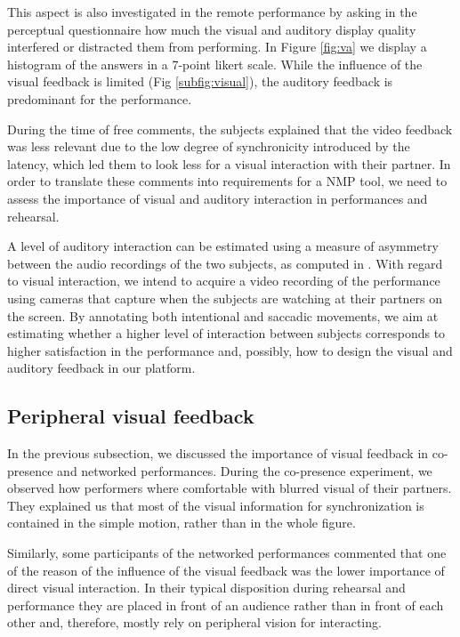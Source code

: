 This aspect is also investigated in the remote performance by asking in the perceptual questionnaire how much the visual and auditory display quality interfered or distracted them from performing. In Figure \ref{fig:va} we display a histogram of the answers in a 7-point likert scale. While the influence of the visual feedback is limited (Fig \ref{subfig:visual}), the auditory feedback is predominant for the performance.

During the time of free comments, the subjects explained that the video feedback was less relevant due to the low degree of synchronicity introduced by the latency, which led them to look less for a visual interaction with their partner. In order to translate these comments into requirements for a NMP tool, we need to assess the importance of visual and auditory interaction in performances and rehearsal.

A level of auditory interaction can be estimated using a measure of asymmetry between the audio recordings of the two subjects, as computed in \cite{Chafe3}. With regard to visual interaction, we intend to acquire a video recording of the performance using cameras that capture when the subjects are watching at their partners on the screen. By annotating both intentional and saccadic movements, we aim at estimating whether a higher level of interaction between subjects corresponds to higher satisfaction in the performance and, possibly, how to design the visual and auditory feedback in our platform.
 
\subsection{Peripheral visual feedback}
In the previous subsection, we discussed the importance of visual feedback in co-presence and networked performances. During the co-presence experiment, we observed how performers where comfortable with blurred visual of their partners. They explained us that most of the visual information for synchronization is contained in the simple motion, rather than in the whole figure.

Similarly, some participants of the networked performances commented that one of the reason of the influence of the visual feedback was the lower importance of direct visual interaction. In their typical disposition during rehearsal and performance they are placed in front of an audience rather than in front of each other and, therefore, mostly rely on peripheral vision for interacting.

